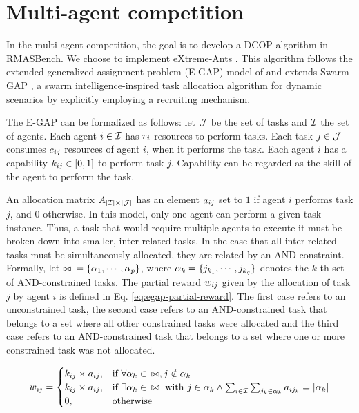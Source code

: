 \section{Multi-agent competition}
\label{sec:multi-agent}

In the multi-agent competition, the goal is to develop a DCOP algorithm in RMASBench. We choose to implement eXtreme-Ants \citep{Santos&Bazzan2009optmas}. This algorithm follows the extended generalized assignment problem (E-GAP) model of \citep{Scerri+2005} and extends Swarm-GAP \citep{Ferreira+2008ccmms}, a swarm intelligence-inspired task allocation algorithm for dynamic scenarios by explicitly employing a recruiting mechanism.

The E-GAP can be formalized as follows: let $\mathcal{J}$ be the set of tasks and $\mathcal{I}$ the set of agents. Each agent $i \in \mathcal{I}$ has $r_{i}$ resources to perform tasks. Each task $j \in \mathcal{J}$ consumes $c_{ij}$ resources of agent $i$, when it performs the task. Each agent $i$ has a capability $k_{ij} \in [0,1]$ to perform task $j$. Capability can be regarded as the skill of the agent to perform the task. %

An allocation matrix $A_{|\mathcal{I}| \times |\mathcal{J}|}$ has an element $a_{ij}$ set to $1$ if agent $i$ performs task $j$, and 0 otherwise. In this model, only one agent can perform a given task instance. Thus, a task that would require multiple agents to execute it must be broken down into smaller, inter-related tasks. In the case that all inter-related tasks must be simultaneously allocated, they are related by an AND constraint. 
Formally, let  $\bowtie \enspace = \{\alpha_{1},\cdots,\alpha_{p} \}$, where $\alpha_{k} = \{j_{k_1},\cdots,j_{k_q}\}$ denotes the $k$-th set of AND-constrained tasks. The partial reward $w_{ij}$ given by the allocation of task $j$ by agent $i$ is defined in Eq. \ref{eq:egap-partial-reward}. The first case refers to an unconstrained task, the second case refers to an AND-constrained task that belongs to a set where all other constrained tasks were allocated and the third case refers to an AND-constrained task that belongs to a set where one or more constrained task was not allocated.

\begin{equation}
\label{eq:egap-partial-reward}
\partialrwd{i}{j} = 
\begin{cases}
  \agtcap{i}{j} \times \allocate{i}{j} ,& \text{if } \forall\andtasks{k} \in \enspace \allandtasks, j \notin \andtasks{k}\\
  \agtcap{i}{j} \times \allocate{i}{j} ,& \text{if } \exists\andtasks{k} \in \enspace \allandtasks \text{ with } j \in \andtasks{k} \wedge \sum_{i \in \agentset}\sum_{j_k \in \andtasks{k}} \allocate{i}{j_k} = |\andtasks{k}| %
  \\
  0,& \text{otherwise}
\end{cases}
\end{equation}


